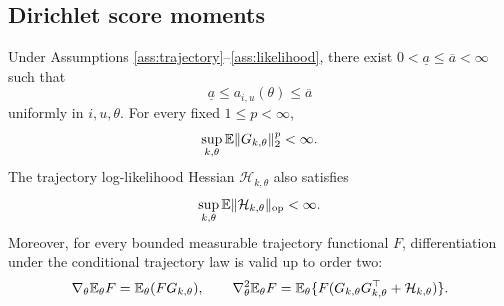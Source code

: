 \subsection{Dirichlet score moments}

\begin{lemma}\label{lem:dirichlet-moments}
Under Assumptions \ref{ass:trajectory}--\ref{ass:likelihood}, there exist $0<\underline a\le\overline a<\infty$ such that
\begin{equation}\label{eq:concentration-compactness}
 \underline a\le a_{i,u}(\theta)\le\overline a
\end{equation}
uniformly in $i,u,\theta$.  For every fixed $1\le p<\infty$,
\begin{equation}\label{eq:score-moment-bound}
 \sup_{k,\theta}\mathbb E\lVert G_{k,\theta}\rVert_2^p<\infty.
\end{equation}
The trajectory log-likelihood Hessian $\mathcal H_{k,\theta}$ also satisfies
\begin{equation}\label{eq:hessian-moment-bound}
 \sup_{k,\theta}\mathbb E\lVert\mathcal H_{k,\theta}\rVert_{\mathrm{op}}<\infty.
\end{equation}
Moreover, for every bounded measurable trajectory functional $F$, differentiation under the conditional trajectory law is valid up to order two:
\begin{equation}\label{eq:likelihood-ratio-identities}
 \nabla_\theta\mathbb E_\theta F=\mathbb E_\theta(FG_{k,\theta}),
 \qquad
 \nabla_\theta^2\mathbb E_\theta F
 =\mathbb E_\theta\{F(G_{k,\theta}G_{k,\theta}^\top+\mathcal H_{k,\theta})\}.
\end{equation}
\end{lemma}

